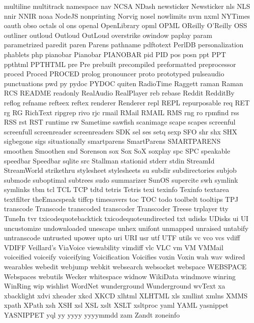 multiline
multitrack
namespace
nav
NCSA
NDash
newsticker
Newsticker
nls
NLS
nnir
NNIR
noaa
NodeJS
nonprinting
Norvig
nosel
nowlimits
nvm
nxml
NYTimes
oauth
obso
octals
ol
ons
openal
OpenLibrary
opml
OPML
OReilly
O'Reilly
OSS
outliner
outloud
Outloud
OutLoud
overstrike
owindow
paplay
param
parametrized
paredit
paren
Parens
pathname
pdftotext
PerlDB
personalization
phablets
php
pianobar
Pianobar
PIANOBAR
pid
PID
pos
posn
ppt
PPT
ppthtml
PPTHTML
pre
Pre
prebuilt
precompiled
preformatted
preprocessor
proced
Proced
PROCED
prolog
pronouncer
proto
prototyped
pulseaudio
punctuations
pwd
py
pydoc
PYDOC
quiten
RadioTime
Raggett
raman
Raman
RCS
README
readonly
RealAudio
RealPlayer
reb
rebase
Reddit
RedditBy
reflog
refname
refteex
reftex
renderer
Renderer
repl
REPL
repurposable
req
RET
rg
RG
RichText
ripgrep
rivo
rjc
rmail
RMail
RMAIL
RMS
rng
ro
rpmfind
rss
RSS
rst
RST
runtime
rw
Sametime
sawfish
scanimage
scape
scapes
screenful
screenfull
screenreader
screenreaders
SDK
sel
ses
setq
sexp
SFO
shr
shx
SHX
sigbegone
sigs
situationally
smartparens
SmartParens
SMARTPARENS
smoothen
Smoothen
snd
Sorenson
sox
Sox
SoX
soxplay
spc
SPC
speakable
speedbar
Speedbar
sqlite
src
Stallman
stationid
stderr
stdin
StreamId
StreamWorld
strikethru
stylesheet
stylesheets
su
subdir
subdirectories
subjob
submode
suboptimal
subtrees
sudo
summarizer
SunOS
supercite
swh
symlink
symlinks
tbm
tcl
TCL
TCP
tdtd
tetris
Tetris
texi
texinfo
Texinfo
textarea
textfilter
theEmacspeak
tiffcp
timesavers
toc
TOC
todo
toolbelt
tooltips
TPJ
transcode
Transcode
transcoded
transcoder
Transcoder
Treese
trplayer
tty
TuneIn
tvr
txicodequotebacktick
txicodequoteundirected
txt
udisks
UDisks
ui
UI
uncustomize
undownloaded
unescape
unhex
unifont
unmapped
unraised
untabify
untranscode
untrusted
upower
upto
uri
URI
usr
utf
UTF
utils
vc
vco
vcs
vdiff
VDIFF
Veillard's
ViaVoice
viewability
vimdiff
vlc
VLC
vm
VM
VMMail
voiceified
voiceify
voiceifying
Voicification
Voicifies
voxin
Voxin
wah
wav
wdired
wearables
webedit
webjump
webkit
websearch
websocket
webspace
WEBSPACE
Webspaces
webutils
Wecker
whitespace
widnow
WikiData
windmove
winring
WinRing
wip
wishlist
WordNet
wunderground
Wunderground
wvText
xa
xbacklight
xdvi
xheader
xkcd
XKCD
xlhtml
XLHTML
xls
xmllint
xmlns
XMMS
xpath
XPath
xsh
XSH
xsl
XSL
xslt
XSLT
xsltproc
yaml
YAML
yasnippet
YASNIPPET
yql
yy
yyyy
yyyymmdd
zam
Zandt
zoneinfo
